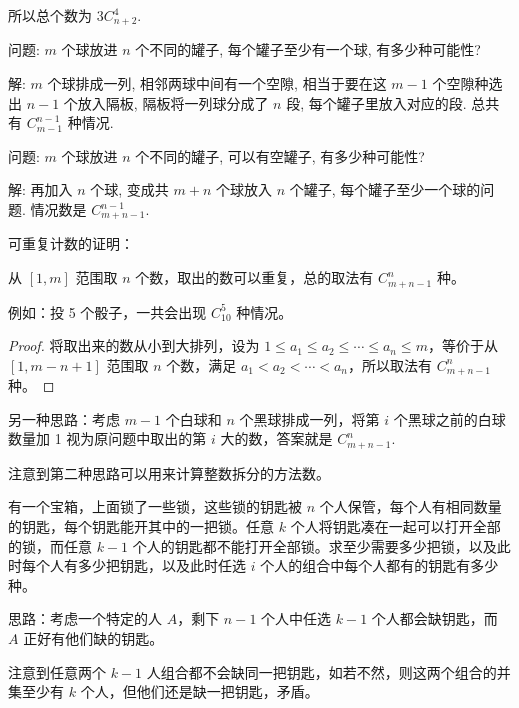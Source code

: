所以总个数为 $ 3C_{n+2}^4 $.

\vbox{}

问题: $m$ 个球放进 $n$ 个不同的罐子, 每个罐子至少有一个球, 有多少种可能性?

解: $m$ 个球排成一列, 相邻两球中间有一个空隙, 相当于要在这 $m-1$ 个空隙种选出 $n-1$ 个放入隔板, 隔板将一列球分成了 $n$ 段, 每个罐子里放入对应的段. 总共有 $C_{m-1}^{n-1}$ 种情况.


\vbox{}

问题: $m$ 个球放进 $n$ 个不同的罐子, 可以有空罐子, 有多少种可能性?

解: 再加入 $n$ 个球, 变成共 $m+n$ 个球放入 $n$ 个罐子, 每个罐子至少一个球的问题. 情况数是 $C_{m+n-1}^{n-1}$.

\newpage


可重复计数的证明：

从 $ [1,m] $ 范围取 $ n $ 个数，取出的数可以重复，总的取法有 $ C_{m+n-1}^n $ 种。 

例如：投 5 个骰子，一共会出现 $ C_{10}^{5} $ 种情况。

\begin{proof}

将取出来的数从小到大排列，设为 $ 1 \le a_1 \le a_2 \le \cdots \le a_n \le m $，等价于从 $ [1,m-n+1] $ 范围取 $ n $ 个数，满足 $ a_1 < a_2 < \cdots < a_n $，所以取法有 $ C_{m+n-1}^n $ 种。

\end{proof}

另一种思路：考虑 $ m - 1 $ 个白球和 $ n $ 个黑球排成一列，将第 $ i $ 个黑球之前的白球数量加 1 视为原问题中取出的第 $ i $ 大的数，答案就是 $ C_{m+n-1}^n $.

注意到第二种思路可以用来计算整数拆分的方法数。

\newpage


有一个宝箱，上面锁了一些锁，这些锁的钥匙被 $ n $ 个人保管，每个人有相同数量的钥匙，每个钥匙能开其中的一把锁。任意 $ k $ 个人将钥匙凑在一起可以打开全部的锁，而任意 $ k - 1 $ 个人的钥匙都不能打开全部锁。求至少需要多少把锁，以及此时每个人有多少把钥匙，以及此时任选 $ i $ 个人的组合中每个人都有的钥匙有多少种。

思路：考虑一个特定的人 $ A $，剩下 $ n - 1 $ 个人中任选 $ k - 1 $ 个人都会缺钥匙，而 $ A $ 正好有他们缺的钥匙。

注意到任意两个 $ k - 1 $ 人组合都不会缺同一把钥匙，如若不然，则这两个组合的并集至少有 $ k $ 个人，但他们还是缺一把钥匙，矛盾。


